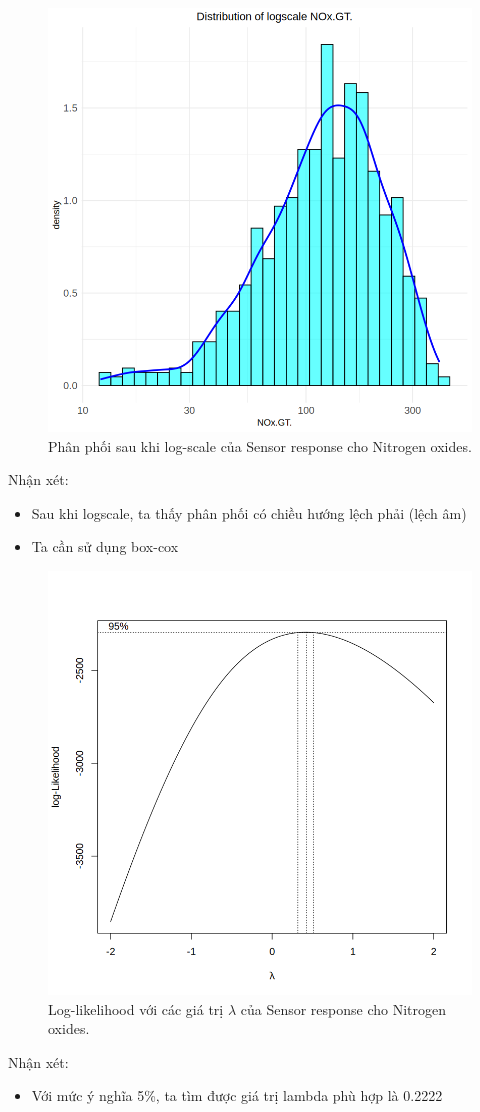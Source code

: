 \begin{figure}[H]
    \centering
    \includegraphics[width=0.75\columnwidth]{air_figures/NOx(GT)_logscale_distribution.png}
    \caption{Phân phối sau khi log-scale của Sensor response cho Nitrogen oxides.}
    \label{fig:nox_logscale_distribution}
\end{figure}
Nhận xét:
\begin{itemize}
    \item Sau khi logscale, ta thấy phân phối có chiều hướng lệch phải (lệch âm)
    \item Ta cần sử dụng box-cox
\end{itemize}

\begin{figure}[H]
    \centering
    \includegraphics[width=0.75\columnwidth]{air_figures/NOx(GT)_optimal_lambda.png}
    \caption{Log-likelihood với các giá trị $\lambda$ của Sensor response cho Nitrogen oxides.}
    \label{fig:nox_optimal_lambda}
\end{figure}
Nhận xét:
\begin{itemize}
    \item Với mức ý nghĩa 5\%, ta tìm được giá trị lambda phù hợp là 0.2222
\end{itemize}

